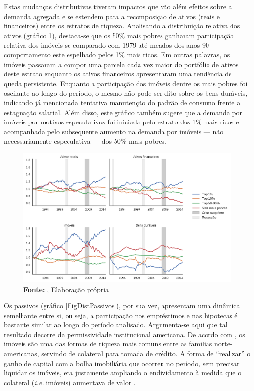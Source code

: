 Estas mudanças distributivas tiveram impactos que vão além efeitos sobre a demanda agregada e se estendem para a recomposição de ativos (reais e financeiros) entre os estratos de riqueza.
Analisando a distribuição relativa dos ativos (gráfico \ref{FigDistAtivos}), destaca-se que os 50\% mais pobres ganharam participação relativa dos imóveis se comparado com 1979 até meados dos anos 90 ---  comportamento este espelhado pelos 1\% mais ricos. 
Em outras palavras, os imóveis passaram a compor uma parcela cada vez maior do portfólio de ativos deste estrato enquanto os ativos financeiros apresentaram uma tendência de queda persistente.
Enquanto a participação dos imóveis dentre os mais pobres foi oscilante ao longo do período, o mesmo não pode ser dito sobre os bens duráveis, indicando já mencionada tentativa manutenção do padrão de consumo frente a estagnação salarial.
Além disso, este gráfico também sugere que a demanda por imóveis por motivos especulativos foi iniciada pelo estrato dos 1\% mais ricos e acompanhada pelo subsequente aumento na demanda por imóveis --- não necessariamente especulativa --- dos 50\% mais pobres.


\begin{figure}[H]
	\centering
	\caption{Distribuição de ativos por percentil de riqueza (1989/07=1)}
	\label{FigDistAtivos}
	\includegraphics[width=\textwidth]{../../Dados/Fatos_Estilizados/figs/Distribuicao_Ativos.png}
	\caption*{\textbf{Fonte:} \textcite{us_census_bureau_characteristics_2017}, Elaboração própria}
\end{figure}

Os passivos (gráfico \ref{FigDistPassivos}), por sua vez, apresentam uma dinâmica semelhante entre si, ou seja, a participação nos empréstimos e nas hipotecas  é bastante similar ao longo do período analisado.
Argumenta-se aqui que tal resultado decorre da permissividade institucional americana.
De acordo com \textcite{teixeira_uma_2011}, os imóveis são uma das formas de riqueza mais comuns entre as famílias norte-americanas, servindo de colateral para tomada de crédito. A forma de ``realizar'' o ganho de capital com a bolha imobiliária que ocorreu no período, sem precisar liquidar os imóveis, era justamente ampliando o endividamento à medida que o colateral (\textit{i.e.} imóveis) aumentava de valor \cite{teixeira_crescimento_2015}. 


